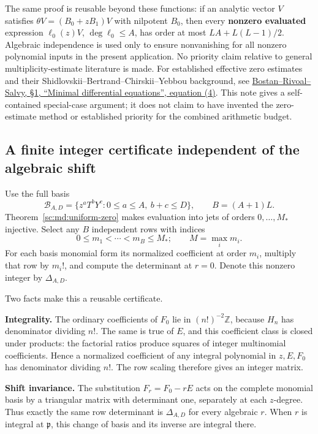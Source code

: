 \documentclass[11pt,a4paper]{article}
\theoremstyle{definition}
\theoremstyle{remark}
\theoremstyle{plain}
\numberwithin{equation}{section}
\begin{document}
The same proof is reusable beyond these functions: if an analytic vector
\(V\) satisfies \(\theta V=(B_0+zB_1)V\) with nilpotent \(B_0\), then
every \textbf{nonzero evaluated} expression \(\ell_0(z)V\),
\(\deg\ell_0\le A\), has order at most \(LA+L(L-1)/2\). Algebraic
independence is used only to ensure nonvanishing for all nonzero
polynomial inputs in the present application. No priority claim relative
to general multiplicity-estimate literature is made. For established
effective zero estimates and their
Shidlovskii--Bertrand--Chirskii--Yebbou background, see
\href{https://arxiv.org/html/1906.05529v4}{Bostan--Rivoal--Salvy, §1,
``Minimal differential equations'', equation (4)}. This note gives a
self-contained special-case argument; it does not claim to have invented
the zero-estimate method or established priority for the combined
arithmetic budget.

\subsection{A finite integer certificate independent of the algebraic
shift}\label{sc:md:a-finite-integer-certificate-independent-of-the-algebraic-shift}

Use the full basis \[
\mathcal B_{A,D}=\{z^aT^bY^c:0\le a\le A,\ b+c\le D\},
\qquad B=(A+1)L.
\] Theorem~\ref{sc:md:uniform-zero} makes evaluation into jets of orders \(0,\ldots,M_*\)
injective. Select any \(B\) independent rows with indices \[
0\le m_1<\cdots<m_B\le M_*;
\qquad M=\max_i m_i.
\] For each basis monomial form its normalized coefficient at order
\(m_i\), multiply that row by \(m_i!\), and compute the determinant at
\(r=0\). Denote this nonzero integer by \(\Delta_{A,D}\).

Two facts make this a reusable certificate.

\textbf{Integrality.} The ordinary coefficients of \(F_0\) lie in
\((n!)^{-2}\mathbb Z\), because \(H_n\) has denominator dividing \(n!\).
The same is true of \(E\), and this coefficient class is closed under
products: the factorial ratios produce squares of integer multinomial
coefficients. Hence a normalized coefficient of any integral polynomial
in \(z,E,F_0\) has denominator dividing \(n!\). The row scaling
therefore gives an integer matrix.

\textbf{Shift invariance.} The substitution \(F_r=F_0-rE\) acts on the
complete monomial basis by a triangular matrix with determinant one,
separately at each \(z\)-degree. Thus exactly the same row determinant
is \(\Delta_{A,D}\) for every algebraic \(r\). When \(r\) is integral at
\(\mathfrak p\), this change of basis and its inverse are integral
there.
\end{document}
